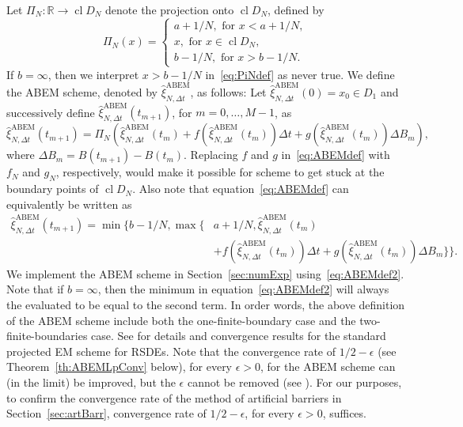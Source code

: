 \documentclass[11pt]{amsart}
\newcommand{\CDDN}{\operatorname{cl} D_{N}}
\newcommand{\ABEM}{\textrm{ABEM}}
\begin{document}
{Let $\Pi_{N} : \mathbb{R} \to \CDDN$ denote the projection onto $\CDDN$, defined by
\begin{equation}\label{eq:PiNdef}
\Pi_{N}(x)=
\begin{cases}
a + 1/N,\text{ for } x < a + 1/N, \\
x,\text{ for } x \in \CDDN, \\
b - 1/N,\text{ for } x > b - 1/N.
\end{cases}
\end{equation}
If $b=\infty$, then we interpret $x > b - 1/N$ in~\eqref{eq:PiNdef} as never true. We define the ABEM scheme, denoted by $\hat{\xi}^{\ABEM}_{N,\Delta t}$, as follows: Let $\hat{\xi}^{\ABEM}_{N,\Delta t}(0) = x_{0} \in D_{1}$  and successively define $\hat{\xi}^{\ABEM}_{N,\Delta t}(t_{m+1})$, for $m=0,\ldots, M-1$, as
\begin{equation}\label{eq:ABEMdef}
\hat{\xi}^{\ABEM}_{N,\Delta t}(t_{m+1}) = \Pi_{N} \left( \hat{\xi}^{\ABEM}_{N,\Delta t}(t_{m}) + f \left( \hat{\xi}^{\ABEM}_{N,\Delta t}(t_{m}) \right) \Delta t + g \left( \hat{\xi}^{\ABEM}_{N,\Delta t}(t_{m}) \right) \Delta B_{m} \right),
\end{equation}
where $\Delta B_{m} = B(t_{m+1}) - B(t_{m})$. Replacing $f$ and $g$ in~\eqref{eq:ABEMdef} with $f_{N}$ and $g_{N}$, respectively, would make it possible for scheme to get stuck at the boundary points of $\CDDN$. Also note that equation~\eqref{eq:ABEMdef} can equivalently be written as
\begin{equation}\label{eq:ABEMdef2}
  \begin{split}
    \hat{\xi}^{\ABEM}_{N,\Delta t}(t_{m+1}) = \min \{ b - 1/N, \max \{ &a + 1/N, \hat{\xi}^{\ABEM}_{N,\Delta t}(t_{m}) \\ &+ f(\hat{\xi}^{\ABEM}_{N,\Delta t}(t_{m})) \Delta t + g(\hat{\xi}^{\ABEM}_{N,\Delta t}(t_{m})) \Delta B_{m} \} \}.
  \end{split}
\end{equation}
We implement the ABEM scheme in Section~\ref{sec:numExp} using~\eqref{eq:ABEMdef2}. Note that if $b = \infty$, then the minimum in equation~\eqref{eq:ABEMdef2} will always the evaluated to be equal to the second term. In order words, the above definition of the ABEM scheme include both the one-finite-boundary case and the two-finite-boundaries case. See \cite{MR1357657,SLOMINSKI1994197} for details and convergence results for the standard projected EM scheme for RSDEs. Note that the convergence rate of $1/2-\epsilon$ (see Theorem~\ref{th:ABEMLpConv} below), for every $\epsilon>0$, for the ABEM scheme can (in the limit) be improved, but the $\epsilon$ cannot be removed (see \cite{MR1357657}). For our purposes, to confirm the convergence rate of the method of artificial barriers in Section~\ref{sec:artBarr}, convergence rate of $1/2-\epsilon$, for every $\epsilon>0$, suffices.

}
\end{document}
